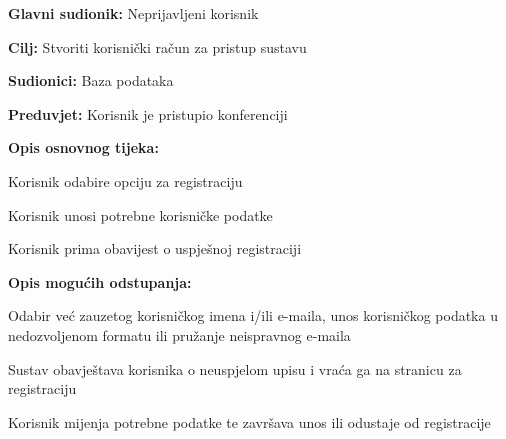 					\noindent {}
					\begin{packed_item}
					
						\item \textbf{Glavni sudionik: } Neprijavljeni korisnik
						\item  \textbf{Cilj:} Stvoriti korisnički račun za pristup sustavu
						\item  \textbf{Sudionici:} Baza podataka
						\item  \textbf{Preduvjet:} Korisnik je pristupio konferenciji 
						\item  \textbf{Opis osnovnog tijeka:}
						
						\item[] \begin{packed_enum}
							
							\item Korisnik odabire opciju za registraciju
							\item Korisnik unosi potrebne korisničke podatke
							\item Korisnik prima obavijest o uspješnoj registraciji

						\end{packed_enum}
						
						\item  \textbf{Opis mogućih odstupanja:}
						
						\item[] \begin{packed_item}
							
							\item[2.a] Odabir već zauzetog korisničkog imena i/ili e-maila, unos korisničkog podatka u nedozvoljenom formatu ili pružanje neispravnog e-maila
							\item[] \begin{packed_enum}
								
								\item Sustav obavještava korisnika o neuspjelom upisu i vraća ga na stranicu za registraciju
								\item Korisnik mijenja potrebne podatke te završava unos ili odustaje od registracije
								
							\end{packed_enum}
							
						\end{packed_item}
					\end{packed_item}	
				
